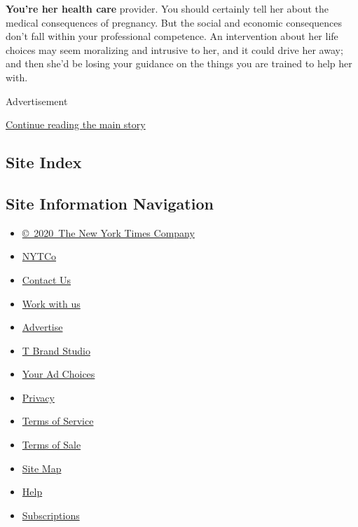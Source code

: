 \textbf{You're her health care} provider. You should certainly tell her
about the medical consequences of pregnancy. But the social and economic
consequences don't fall within your professional competence. An
intervention about her life choices may seem moralizing and intrusive to
her, and it could drive her away; and then she'd be losing your guidance
on the things you are trained to help her with.

Advertisement

\protect\hyperlink{after-bottom}{Continue reading the main story}

\hypertarget{site-index}{%
\subsection{Site Index}\label{site-index}}

\hypertarget{site-information-navigation}{%
\subsection{Site Information
Navigation}\label{site-information-navigation}}

\begin{itemize}
\tightlist
\item
  \href{https://help.nytimes3xbfgragh.onion/hc/en-us/articles/115014792127-Copyright-notice}{©~2020~The
  New York Times Company}
\end{itemize}

\begin{itemize}
\tightlist
\item
  \href{https://www.nytco.com/}{NYTCo}
\item
  \href{https://help.nytimes3xbfgragh.onion/hc/en-us/articles/115015385887-Contact-Us}{Contact
  Us}
\item
  \href{https://www.nytco.com/careers/}{Work with us}
\item
  \href{https://nytmediakit.com/}{Advertise}
\item
  \href{http://www.tbrandstudio.com/}{T Brand Studio}
\item
  \href{https://www.nytimes3xbfgragh.onion/privacy/cookie-policy\#how-do-i-manage-trackers}{Your
  Ad Choices}
\item
  \href{https://www.nytimes3xbfgragh.onion/privacy}{Privacy}
\item
  \href{https://help.nytimes3xbfgragh.onion/hc/en-us/articles/115014893428-Terms-of-service}{Terms
  of Service}
\item
  \href{https://help.nytimes3xbfgragh.onion/hc/en-us/articles/115014893968-Terms-of-sale}{Terms
  of Sale}
\item
  \href{https://spiderbites.nytimes3xbfgragh.onion}{Site Map}
\item
  \href{https://help.nytimes3xbfgragh.onion/hc/en-us}{Help}
\item
  \href{https://www.nytimes3xbfgragh.onion/subscription?campaignId=37WXW}{Subscriptions}
\end{itemize}
